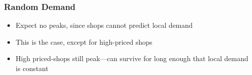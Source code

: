 \documentclass{beamer}
\begin{document}
\frame
{
  \frametitle{Random Demand}
  \begin{minipage}{0.4\textwidth}
    \begin{itemize}
      \setlength{\itemsep}{\baselineskip}
    \item<1-> Expect no peaks, since shops cannot predict local demand
    \item<2-> This is the case, except for high-priced shops
    \item<3-> High priced-shops still peak---can survive for long
      enough that local demand is constant
    \end{itemize}
  \end{minipage}
  \begin{minipage}{0.5\textwidth}
  \end{minipage}
}
\end{document}
